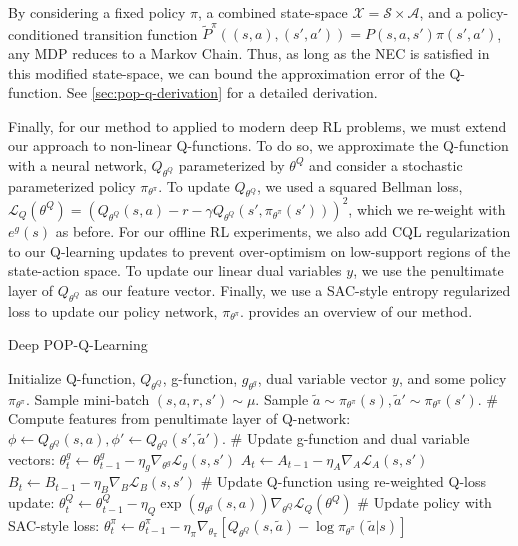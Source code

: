 By considering a fixed policy $\pi$, a combined state-space $\mathcal{X} = \mathcal{S} \times \mathcal{A}$, and a policy-conditioned transition function $\tilde{P}^\pi((s, a), (s', a')) = P(s, a, s') \pi(s', a')$, any MDP reduces to a Markov Chain.
Thus, as long as the NEC is satisfied in this modified state-space, we can bound the approximation error of the Q-function.
See \cref{sec:pop-q-derivation} for a detailed derivation.

Finally, for our method to applied to modern deep RL problems, we must extend our approach to non-linear Q-functions.
To do so, we approximate the Q-function with a neural network, $Q_{\theta^Q}$ parameterized by $\theta^Q$ and consider a stochastic parameterized policy $\pi_{\theta^\pi}$.
To update $Q_{\theta^Q}$, we used a squared Bellman loss, $\mathcal{L}_Q(\theta^Q) = (Q_{\theta^Q}(s, a) - r - \gamma Q_{\theta^Q}(s', \pi_{\theta^\pi}(s')))^2$, which we re-weight with $e^g(s)$ as before.
For our offline RL experiments, we also add CQL regularization \citep{kumar2020cql} to our Q-learning updates to prevent over-optimism on low-support regions of the state-action space.
To update our linear dual variables $y$, we use the penultimate layer of $Q_{\theta^Q}$ as our feature vector.
Finally, we use a SAC-style entropy regularized loss to update our policy network, $\pi_{\theta^\pi}$.
 provides an overview of our method.


\begin{algorithm}[tb]
  \caption{Deep POP-Q-Learning}
  \label{alg:example}
  \begin{algorithmic}
    \STATE  Initialize Q-function, $Q_{\theta^Q}$, g-function, $g_{\theta^g}$, dual variable vector $y$, and some policy $\pi_{\theta^\pi}$.
    \STATE Sample mini-batch $(s, a, r, s') \sim \mu$.
    \STATE Sample $\tilde{a} \sim \pi_{\theta^\pi}(s), \tilde{a}' \sim \pi_{\theta^\pi}(s')$.
    \STATE \# Compute features from penultimate layer of Q-network:
    \STATE $\phi \gets Q_{\theta^Q}(s, a), \phi' \gets Q_{\theta^Q}(s', \tilde{a}')$.
    \STATE \# Update g-function and dual variable vectors:
    \STATE $\theta^g_t \gets \theta^g_{t-1} - \eta_g \nabla_{\theta^g} \mathcal{L}_g(s, s')$
    \STATE $A_t \gets A_{t-1} - \eta_A \nabla_{A} \mathcal{L}_{A}(s, s')$
    \STATE $B_t \gets B_{t-1} - \eta_B \nabla_{B} \mathcal{L}_{B}(s, s')$
    \STATE \# Update Q-function using re-weighted Q-loss update:
    \STATE $\theta^Q_t \gets \theta^Q_{t-1} - \eta_Q \exp (g_{\theta^g}(s, a)) \nabla_{\theta^Q} \mathcal{L}_Q(\theta^Q)$
    \STATE \# Update policy with SAC-style loss:
    \STATE $\theta^\pi_t \gets \theta^\pi_{t-1} - \eta_\pi \nabla_{\theta_\pi} [Q_{\theta^Q}(s, \tilde{a}) - \log \pi_{\theta^\pi}(\tilde{a} | s)]$
    \ENDFOR
  \end{algorithmic}
\end{algorithm}

